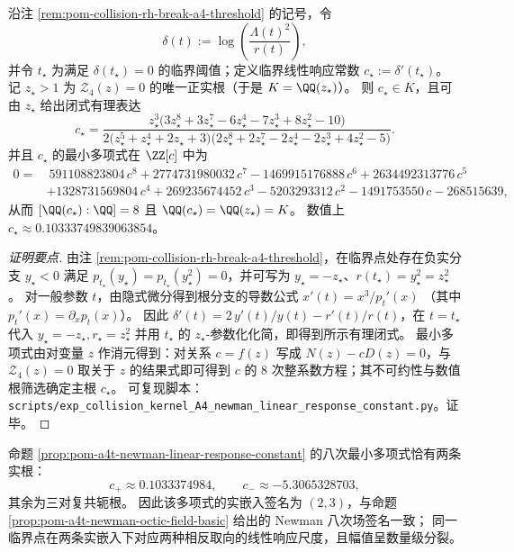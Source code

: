 \begin{proposition}[Newman 临界线性响应常数的代数封闭：\texorpdfstring{$\QQ(c_\star)=\QQ(z_\star)$}{Q(c*)=Q(z*)}]\label{prop:pom-a4t-newman-linear-response-constant}
沿注 \ref{rem:pom-collision-rh-break-a4-threshold} 的记号，令
\[
\delta(t):=\log\!\left(\frac{\Lambda(t)^2}{r(t)}\right),
\]
并令 \(t_\star\) 为满足 \(\delta(t_\star)=0\) 的临界阈值；定义临界线性响应常数 \(c_\star:=\delta'(t_\star)\)。
记 \(z_\star>1\) 为 \(\mathcal Z_4(z)=0\) 的唯一正实根（于是 \(K=\QQ(z_\star)\)）。
则 \(c_\star\in K\)，且可由 \(z_\star\) 给出闭式有理表达
\[
c_\star=\frac{z_\star^{3}\bigl(3z_\star^{8}+3z_\star^{7}-6z_\star^{4}-7z_\star^{3}+8z_\star^{2}-10\bigr)}
{2\bigl(z_\star^{5}+z_\star^{4}+2z_\star+3\bigr)\bigl(2z_\star^{8}+2z_\star^{7}-2z_\star^{4}-2z_\star^{3}+4z_\star^{2}-5\bigr)}.
\]
并且 \(c_\star\) 的最小多项式在 \(\ZZ[c]\) 中为
\[
\begin{aligned}
0=&\ 591108823804\,c^{8}+2774731980032\,c^{7}-1469915176888\,c^{6}+2634492313776\,c^{5}\\
&+1328731569804\,c^{4}+269235674452\,c^{3}-5203293312\,c^{2}-1491753550\,c-268515639,
\end{aligned}
\]
从而 \([\QQ(c_\star):\QQ]=8\) 且 \(\QQ(c_\star)=\QQ(z_\star)=K\)。
数值上 \(c_\star\approx 0.10333749839063854\)。
\end{proposition}
\begin{proof}[证明要点]
由注 \ref{rem:pom-collision-rh-break-a4-threshold}，在临界点处存在负实分支 \(y_\star<0\) 满足
\(
p_{t_\star}(y_\star)=p_{t_\star}(y_\star^2)=0
\)，并可写为 \(y_\star=-z_\star\)、\(r(t_\star)=y_\star^2=z_\star^2\)。
对一般参数 \(t\)，由隐式微分得到根分支的导数公式
\(
x'(t)=x^3/p_t'(x)
\)
（其中 \(p_t'(x)=\partial_x p_t(x)\)）。
因此
\(
\delta'(t)=2\,y'(t)/y(t)-r'(t)/r(t)
\)，在 \(t=t_\star\) 代入 \(y_\star=-z_\star,r_\star=z_\star^2\) 并用 \(t_\star\) 的 \(z_\star\)-参数化化简，即得到所示有理闭式。
最小多项式由对变量 \(z\) 作消元得到：对关系 \(c=f(z)\) 写成 \(N(z)-cD(z)=0\)，与 \(\mathcal Z_4(z)=0\) 取关于 \(z\) 的结果式即可得到 \(c\) 的 8 次整系数方程；其不可约性与数值根筛选确定主根 \(c_\star\)。
可复现脚本：\texttt{scripts/exp\_collision\_kernel\_A4\_newman\_linear\_response\_constant.py}。证毕。
\end{proof}

\begin{remark}\label{rem:pom-a4t-newman-linear-response-two-real-embeddings}
命题 \ref{prop:pom-a4t-newman-linear-response-constant} 的八次最小多项式恰有两条实根：
\[
c_{+}\approx 0.1033374984,\qquad c_{-}\approx -5.3065328703,
\]
其余为三对复共轭根。
因此该多项式的实嵌入签名为 \((2,3)\)，与命题 \ref{prop:pom-a4t-newman-octic-field-basic} 给出的 Newman 八次场签名一致；
同一临界点在两条实嵌入下对应两种相反取向的线性响应尺度，且幅值呈数量级分裂。
\end{remark}

